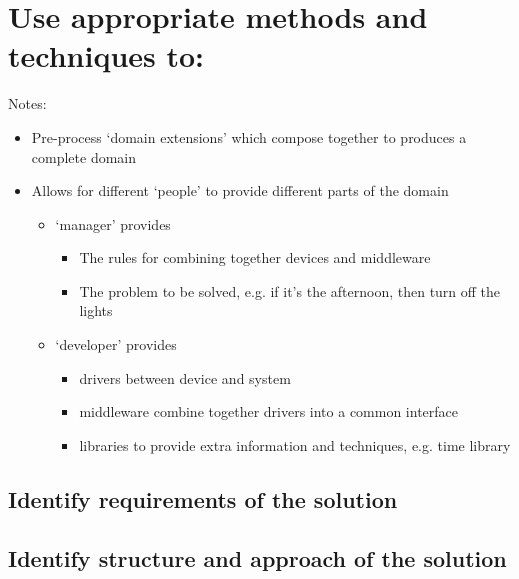 \section{Use appropriate methods and techniques to:}

Notes:
\begin{itemize}
\item Pre-process `domain extensions' which compose together to produces a
  complete domain
\item Allows for different `people' to provide different parts of the domain
  \begin{itemize}
  \item `manager' provides
    \begin{itemize}
    \item The rules for combining together devices and middleware
    \item The problem to be solved,
      e.g. if it's the afternoon, then turn off the lights
    \end{itemize}
  \item `developer' provides
    \begin{itemize}
    \item drivers between device and system
    \item middleware combine together drivers into a common interface
    \item libraries to provide extra information and techniques, e.g. time library
    \end{itemize}
  \end{itemize}
\end{itemize}

\subsection{Identify requirements of the solution}

\subsection{Identify structure and approach of the solution}
